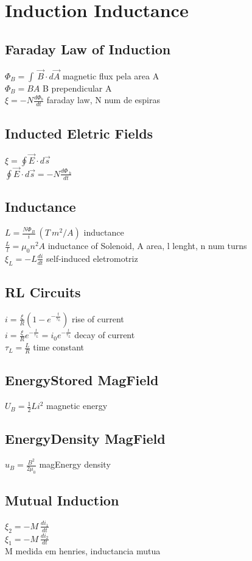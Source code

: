 \section{Induction Inductance}
\subsection{Faraday Law of Induction}
$\Phi _B=\int \:\vec{B}\cdot d\vec{A}$ magnetic flux pela area A\\
$\Phi _B=BA$ B prependicular A\\
$\xi =-N\frac{d\Phi _b}{dt}$ faraday law, N num de espiras\\
\subsection{Inducted Eletric Fields}
$\xi =\oint \vec{E}\cdot d\vec{s}$\\
$\oint \vec{E}\cdot d\vec{s}=-N\frac{d\Phi \:_b}{dt}$\\
\subsection{Inductance}
$L=\frac{N\Phi _B}{i}\:\left(T\:m^2/A\right)$ inductance\\
$\frac{L}{l}=\mu _0n^2A$ inductance of Solenoid, A area, l lenght, n num turns\\
$\xi _L=-L\frac{di}{dt}$ self-induced eletromotriz\\
\subsection{RL Circuits}
$i=\frac{\xi }{R}\left(1-e^{-\frac{t}{\tau _L}}\right)$ rise of current\\
$i=\frac{\xi }{R}e^{-\frac{t}{\tau _L}}=i_0e^{-\frac{t}{\tau _L}}$ decay of current\\
$\tau _L=\frac{L}{R}$ time constant\\
\subsection{EnergyStored MagField}
$U_B=\frac{1}{2}Li^2$ magnetic energy\\
\subsection{EnergyDensity MagField}
$u_B=\frac{B^2}{2\mu _0}$ magEnergy density\\
\subsection{Mutual Induction}
$\xi _2=-M\:\frac{di_1}{dt}$\\
$\xi _1=-M\:\frac{di_2}{dt}$\\
M medida em henries, inductancia mutua\\